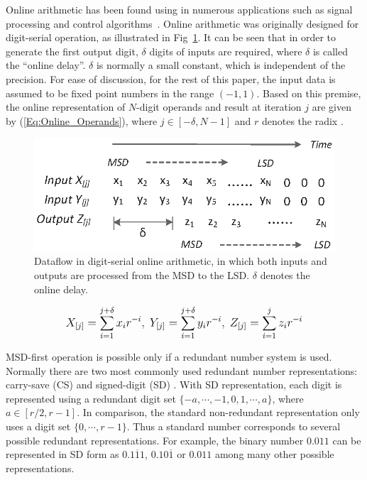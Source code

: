 \documentclass[10pt, conference, compsocconf]{IEEEtran}
\begin{document}
Online arithmetic has been found using in numerous applications such as signal processing and control algorithms~\cite{Online_FPGADSP,Online_Control}. Online arithmetic was originally designed for digit-serial operation, as illustrated in Fig~\ref{Fig:OnlineDataFlow}. It can be seen that in order to generate the first output digit, $\delta$ digits of inputs are required, where $\delta$ is called the ``online delay''. $\delta$ is normally a small constant, which is independent of the precision. For ease of discussion, for the rest of this paper, the input data is assumed to be fixed point numbers in the range $(-1,1)$. Based on this premise, the online representation of $N$-digit operands and result at iteration $j$ are given by (\ref{Eq:Online_Operands}), where $j\in[-\delta,N-1]$ and $r$ denotes the radix \cite{Ercegovac_Book}.
%
\begin{figure}[tbp]
  \centering
  \includegraphics[width=.42\textwidth]{./figures/OnlineArithmetic_DataFlow.eps}
  \caption{Dataflow in digit-serial online arithmetic, in which both inputs and outputs are processed from the MSD to the LSD. $\delta$ denotes the online delay.}
  \vspace{-2ex}
  \label{Fig:OnlineDataFlow}
\end{figure}
%
\begin{eqnarray}\label{Eq:Online_Operands}
\footnotesize
  X_{[j]}=\sum_{i=1}^{j+\delta}x_ir^{-i},~Y_{[j]}=\sum_{i=1}^{j+\delta}y_ir^{-i},~Z_{[j]}=\sum_{i=1}^{j}z_ir^{-i}
\normalsize
\end{eqnarray}

MSD-first operation is possible only if a redundant number system is used. Normally there are two most commonly used redundant number representations: carry-save (CS) \cite{CSadder} and signed-digit (SD) \cite{RedundantNumber}. With SD representation, each digit is represented using a redundant digit set $\{-a, \cdots,-1,0, 1, \cdots, a\}$, where $a\in[r/2,r-1]$. In comparison, the standard non-redundant representation only uses a digit set $\{0,\cdots,r-1\}$. Thus a standard number corresponds to several possible redundant representations. For example, the binary number $0.011$ can be represented in SD form as $0.1\overline{1}1$, $0.10\overline{1}$ or $0.011$ among many other possible representations.
\end{document}
